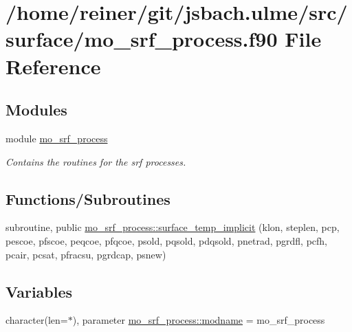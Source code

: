 \hypertarget{mo__srf__process_8f90}{}\section{/home/reiner/git/jsbach.ulme/src/surface/mo\+\_\+srf\+\_\+process.f90 File Reference}
\label{mo__srf__process_8f90}
\subsection*{Modules}
\begin{DoxyCompactItemize}
\item 
module \hyperlink{namespacemo__srf__process}{mo\+\_\+srf\+\_\+process}
\begin{DoxyCompactList}\small\item\em Contains the routines for the srf processes. \end{DoxyCompactList}\end{DoxyCompactItemize}
\subsection*{Functions/\+Subroutines}
\begin{DoxyCompactItemize}
\item 
subroutine, public \hyperlink{namespacemo__srf__process_aa120db81e24075287f867d3958eca237}{mo\+\_\+srf\+\_\+process\+::surface\+\_\+temp\+\_\+implicit} (klon, steplen, pcp, pescoe, pfscoe, peqcoe, pfqcoe, psold, pqsold, pdqsold, pnetrad, pgrdfl, pcfh, pcair, pcsat, pfracsu, pgrdcap, psnew)
\end{DoxyCompactItemize}
\subsection*{Variables}
\begin{DoxyCompactItemize}
\item 
character(len=$\ast$), parameter \hyperlink{namespacemo__srf__process_a74a1ddcea9503b7ef5d8ac1d52d3b3b4}{mo\+\_\+srf\+\_\+process\+::modname} = \textquotesingle{}mo\+\_\+srf\+\_\+process\textquotesingle{}
\end{DoxyCompactItemize}
